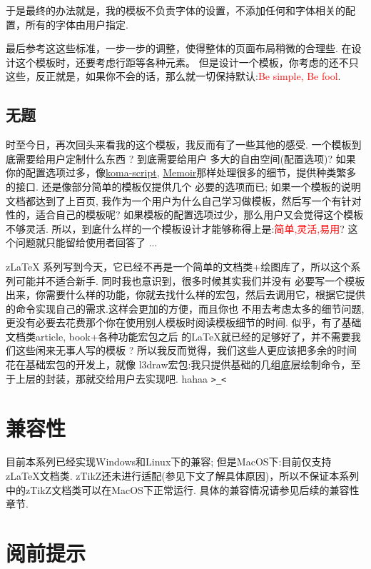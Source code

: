 于是最终的办法就是，我的模板不负责字体的设置，不添加任何和字体相关的配置，所有的字体由用户指定. 


最后参考这这些标准，一步一步的调整，使得整体的页面布局稍微的合理些. 在设计这个模板时，还要考虑行距等各种元素。
但是设计一个模板，你考虑的还不只这些，反正就是，如果你不会的话，那么就一切保持默认:\textcolor{red}{Be simple, Be fool}.

\subsection{无题}
时至今日，再次回头来看我的这个模板，我反而有了一些其他的感受. 一个模板到底需要给用户定制什么东西 ? 到底需要给用户
多大的自由空间(配置选项)? 如果你的配置选项过多，像\href{https://www.ctan.org/pkg/koma-script}{koma-script}, 
\href{https://ctan.org/pkg/memoir}{Memoir}那样处理很多的细节，提供种类繁多的接口. 还是像部分简单的模板仅提供几个
必要的选项而已; 如果一个模板的说明文档都达到了上百页, 我作为一个用户为什么自己学习做模板，然后写一个有针对性的，适合自己的模板呢? 
如果模板的配置选项过少，那么用户又会觉得这个模板不够灵活. 所以，到底什么样的一个模板设计才能够称得上是:\textcolor{red}{简单,灵活,易用}?
这个问题就只能留给使用者回答了 ...

z\LaTeX{} 系列写到今天，它已经不再是一个简单的文档类+绘图库了，所以这个系列可能并不适合新手. 同时我也意识到，很多时候其实我们并没有
必要写一个模板出来，你需要什么样的功能，你就去找什么样的宏包，然后去调用它，根据它提供的命令实现自己的需求.这样会更加的方便，而且你也
不用去考虑太多的细节问题,更没有必要去花费那个你在使用别人模板时阅读模板细节的时间. 似乎，有了基础文档类article, book+各种功能宏包之后
的\LaTeX{}就已经的足够好了，并不需要我们这些闲来无事人写的模板 ? 所以我反而觉得，我们这些人更应该把多余的时间花在基础宏包的开发上，就像 
l3draw宏包:我只提供基础的几组底层绘制命令，至于上层的封装，那就交给用户去实现吧. hahaa \texttt{>\_<}

\section{兼容性}
目前本系列已经实现Windows和Linux下的兼容; 但是MacOS下:目前仅支持z\LaTeX{}文档类.
zTikZ还未进行适配(参见下文了解具体原因)，所以不保证本系列中的zTikZ文档类可以在MacOS下正常运行.
具体的兼容情况请参见后续的兼容性章节.


\section{阅前提示}
